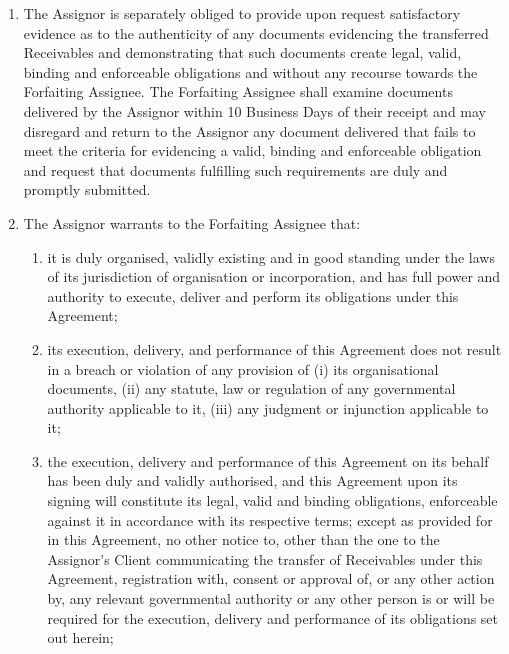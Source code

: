 \documentclass[a4paper]{article}
\begin{document}
\begin{multicols}{2}
\begin{enumerate}
  \item{The Assignor is separately obliged to provide upon request
      satisfactory evidence as to the authenticity of any documents
      evidencing the transferred Receivables and demonstrating that
      such documents create legal, valid, binding and enforceable
      obligations and without any recourse towards the Forfaiting
      Assignee. The Forfaiting Assignee shall examine documents
      delivered by the Assignor within 10 Business Days of their
      receipt and may disregard and return to the Assignor any
      document delivered that fails to meet the criteria for
      evidencing a valid, binding and enforceable obligation and
      request that documents fulfilling such requirements are duly and
      promptly submitted.}

  \item{The Assignor warrants to the Forfaiting Assignee that:}

    \begin{enumerate}

    \item{it is duly organised, validly existing and in good standing
        under the laws of its jurisdiction of organisation or
        incorporation, and has full power and authority to execute,
        deliver and perform its obligations under this Agreement;}

    \item{its execution, delivery, and performance of this Agreement
        does not result in a breach or violation of any provision of
        (i) its organisational documents, (ii) any statute, law or
        regulation of any governmental authority applicable to it,
        (iii) any judgment or injunction applicable to it;}

    \item{the execution, delivery and performance of this Agreement on
        its behalf has been duly and validly authorised, and this
        Agreement upon its signing will constitute its legal, valid
        and binding obligations, enforceable against it in accordance
        with its respective terms; except as provided for in this
        Agreement, no other notice to, other than the one to the
        Assignor’s Client communicating the transfer of Receivables
        under this Agreement, registration with, consent or approval
        of, or any other action by, any relevant governmental
        authority or any other person is or will be required for the
        execution, delivery and performance of its obligations set out
        herein;}


\end{enumerate}
\end{enumerate}
\end{multicols}
\end{document}

